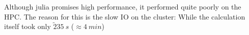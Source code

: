 Although julia promises high performance, it performed quite poorly on the HPC.
The reason for this is the slow IO on the cluster: While the calculation itself took only $\tilde 235~s$ ($\approx 4~min$)
%
%
%
%     
%
